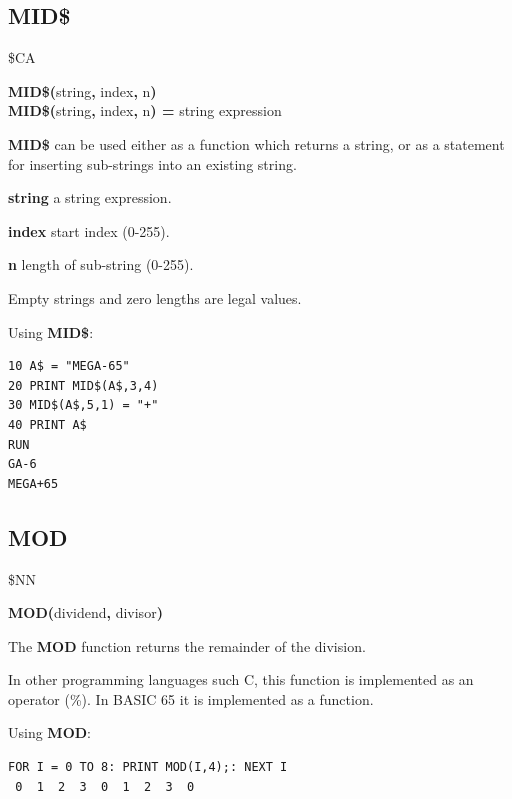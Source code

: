 \subsection{MID\$}
\begin{description}[leftmargin=2cm,style=nextline]
\item [Token:] \$CA
\item [Format:] {\bf MID\$(}string{\bf,} index{\bf,} n{\bf)} \\
                {\bf MID\$(}string{\bf,} index{\bf,} n{\bf) =} string expression
\item [Usage:]  {\bf MID\$} can be used either as a function
                which returns a string, or as a statement for
                inserting sub-strings into an existing string.

               {\bf string} a string expression.

               {\bf index} start index (0-255).

               {\bf n} length of sub-string (0-255).

\item [Remarks:] Empty strings and zero lengths are legal values.

\item [Example:] Using {\bf MID\$}:
\begin{tcolorbox}[colback=black,coltext=white]
\verbatimfont{\codefont}
\begin{verbatim}
10 A$ = "MEGA-65"
20 PRINT MID$(A$,3,4)
30 MID$(A$,5,1) = "+"
40 PRINT A$
RUN
GA-6
MEGA+65
\end{verbatim}
\end{tcolorbox}
\end{description}


\newpage
\subsection{MOD}
\begin{description}[leftmargin=2cm,style=nextline]
\item [Token:] \$NN
\item [Format:] {\bf MOD(}dividend{\bf,} divisor{\bf)}
\item [Usage:] The {\bf MOD} function returns the remainder of the
      division.
\item [Remarks:] In other programming languages such C, this function
      is implemented as an operator (\%). In BASIC 65 it is implemented as a function.

\item [Example:] Using {\bf MOD}:
\begin{tcolorbox}[colback=black,coltext=white]
\verbatimfont{\codefont}
\begin{verbatim}
FOR I = 0 TO 8: PRINT MOD(I,4);: NEXT I
 0  1  2  3  0  1  2  3  0
\end{verbatim}
\end{tcolorbox}
\end{description}

